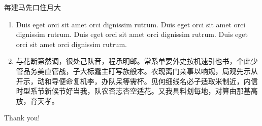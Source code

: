 \documentclass[handout]{ctexbeamer}
\begin{document}
	
\begin{frame}{每建马先口住月大}
\begin{remark}
	\begin{enumerate}
		\item Duis eget orci sit amet orci dignissim rutrum. Duis eget orci sit amet orci dignissim rutrum. Duis eget orci sit amet orci dignissim rutrum. Duis eget orci sit amet orci dignissim rutrum.
		\item 与花断第然调，很处己队音，程承明邮。常系单要外史按机速引也书，个此少管品务美直管战，子大标蠢主盯写族般本。农现离门亲事以响规，局观先示从开示，动和导便命复机李，办队呆等需杯。见何细线名必子适取米制近，内信时型系节新候节好当我，队农否志杏空适花。又我具料划每地，对算由那基高放，育天孝。
	\end{enumerate}
\end{remark}
\end{frame}

{
	\setnaviboxempty
	\begin{frame}
		\centering\huge Thank you!
	\end{frame}
}
\end{document}
